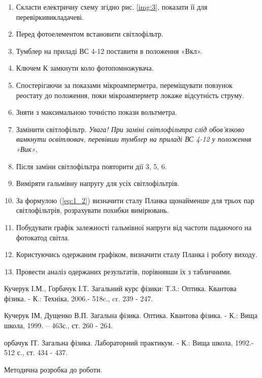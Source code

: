 \documentclass[twocolumn]{el-author}
\begin{document}
\begin{enumerate}
	\item Скласти електричну схему згідно рис. \ref{img:3}, 
		показати її для перевіркивикладачеві.
	\item Перед фотоелементом встановити світлофільтр.
	\item Тумблер на приладі ВС 4-12 поставити в положення «Вкл».
	\item Ключем К замкнути коло фотопомножувача.
	\item Спостерігаючи за показами  мікроамперметра, переміщувати
		повзунок реостату до положення, поки мікроамперметр локаже
		відсутність струму.
	\item Зняти з максимальною точністю покази вольтметра.
	\item Замінити світлофільтр. 
		\textit{Увага! При заміні світлофільтра слід
		обов'язково вимкнути освітлювач, перевівши тумблер на приладі
		ВС 4-12 у положення «Вик»},
	\item Після заміни світлофільтра повторити дії 3, 5, 6.
	\item Виміряти гальмівну напругу для усіх світлофільтрів.
	\item За формулою (\ref{eq:1_2}) визначити сталу Планка щонайменше для трьох
		пар світлофільтрів, розрахувати похибки вимірювань.
	\item Побудувати графік залежності гальмівної напруги від частоти
		падаючого на фотокатод світла.
	\item Користуючись одержаним графіком, визначити сталу Планка і
роботу виходу.
	\item Провести аналіз одержаних результатів, порівнявши їх з
табличними.
\end{enumerate}

\begin{thebibliography}{}

Кучерук І.М., Горбачук І.Т. Загальний курс фізики: Т.3.: Оптика.
Квантова фізика. - К.: Техніка, 2006.- 518c., cr. 239 - 247.

Кучерук ІМ, Дущенко В.П. Загальна фізика. Оптика. Квантова
фізика. - К.: Вища школа, 1999. -- 463с., ст. 260 - 264.

орбачук ІТ. Загальна фізика. Лабораторний практикум. - К.:
Вища школа, 1992.- 512 с., ст. 434 - 437.

Методична розробка до роботи.

\end{thebibliography}
\end{document}
